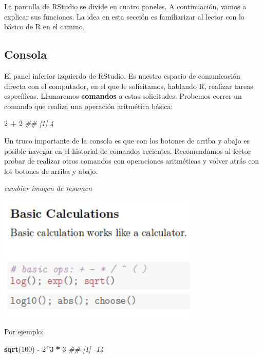 \documentclass[]{book}
\newenvironment{Shaded}{\begin{snugshade}}{\end{snugshade}}
\newcommand{\CommentTok}[1]{\textcolor[rgb]{0.56,0.35,0.01}{\textit{#1}}}
\newcommand{\DecValTok}[1]{\textcolor[rgb]{0.00,0.00,0.81}{#1}}
\newcommand{\KeywordTok}[1]{\textcolor[rgb]{0.13,0.29,0.53}{\textbf{#1}}}
\newcommand{\NormalTok}[1]{#1}
\newcommand{\OperatorTok}[1]{\textcolor[rgb]{0.81,0.36,0.00}{\textbf{#1}}}
\newcommand{\StringTok}[1]{\textcolor[rgb]{0.31,0.60,0.02}{#1}}
\begin{document}
La pantalla de RStudio se divide en cuatro paneles. A continuación,
vamos a explicar sus funciones. La idea en esta sección es familiarizar
al lector con lo básico de R en el camino.

\hypertarget{consola}{%
\subsection{Consola}\label{consola}}

El panel inferior izquierdo de RStudio. Es nuestro espacio de
comunicación directa con el computador, en el que le solicitamos,
hablando R, realizar tareas específicas. Llamaremos \textbf{comandos} a
estas solicitudes. Probemos correr un comando que realiza una operación
aritmética básica:

\begin{Shaded}
\begin{Highlighting}[]
\DecValTok{2} \OperatorTok{+}\StringTok{ }\DecValTok{2}
\CommentTok{## [1] 4}
\end{Highlighting}
\end{Shaded}

Un truco importante de la consola es que con los botones de arriba y
abajo es posible navegar en el historial de comandos recientes.
Recomendamos al lector probar de realizar otros comandos con operaciones
aritméticas y volver atrás con los botones de arriba y abajo.

\emph{cambiar imagen de resumen}

\begin{center}\includegraphics[width=3.76in]{00-images/rbas-basiccalc} \end{center}

Por ejemplo:

\begin{Shaded}
\begin{Highlighting}[]
\KeywordTok{sqrt}\NormalTok{(}\DecValTok{100}\NormalTok{) }\OperatorTok{-}\StringTok{ }\DecValTok{2}\OperatorTok{^}\DecValTok{3} \OperatorTok{*}\StringTok{ }\DecValTok{3}
\CommentTok{## [1] -14}
\end{Highlighting}
\end{Shaded}
\end{document}
